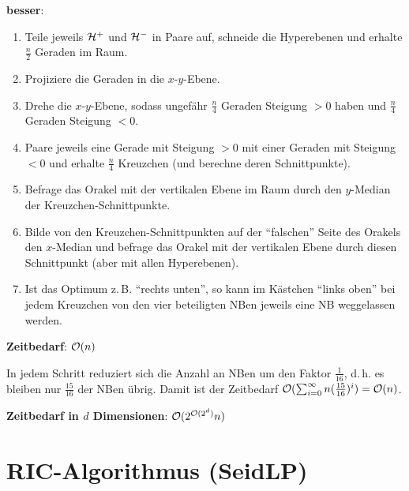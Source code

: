 \textbf{besser}:
\begin{enumerate}
    \item
    Teile jeweils $\mathcal{H}^+$ und $\mathcal{H}^-$ in Paare auf, schneide die Hyperebenen und erhalte
    $\frac{n}{2}$ Geraden im Raum.

    \item
    Projiziere die Geraden in die $x$-$y$-Ebene.

    \item
    Drehe die $x$-$y$-Ebene, sodass ungefähr $\frac{n}{4}$ Geraden Steigung $> 0$ haben und
    $\frac{n}{4}$ Geraden Steigung $< 0$.

    \item
    Paare jeweils eine Gerade mit Steigung $> 0$ mit einer Geraden mit Steigung $< 0$
    und erhalte $\frac{n}{4}$ Kreuzchen
    (und berechne deren Schnittpunkte).

    \item
    Befrage das Orakel mit der vertikalen Ebene im Raum durch den $y$-Median der
    Kreuzchen-Schnittpunkte.

    \item
    Bilde von den Kreuzchen-Schnittpunkten auf der "`falschen"' Seite des Orakels den $x$-Median
    und befrage das Orakel mit der vertikalen Ebene durch diesen Schnittpunkt
    (aber mit allen Hyperebenen).

    \item
    Ist das Optimum z.\,B. "`rechts unten"', so kann im Kästchen "`links oben"' bei jedem
    Kreuzchen von den vier beteiligten NBen jeweils eine NB weggelassen werden.
\end{enumerate}

\textbf{Zeitbedarf}:
$\mathcal{O}(n)$

\begin{Beweis}
    In jedem Schritt reduziert sich die Anzahl an NBen um den Faktor $\frac{1}{16}$,
    d.\,h. es bleiben nur $\frac{15}{16}$ der NBen übrig.
    Damit ist der Zeitbedarf $\mathcal{O}(\sum_{i=0}^\infty n(\frac{15}{16})^i) = \mathcal{O}(n)$.
\end{Beweis}

\textbf{Zeitbedarf in $d$ Dimensionen}:
$\mathcal{O}(2^{\mathcal{O}(2^d)} n)$

\pagebreak

\section{%
    RIC-Algorithmus (SeidLP)%
}

